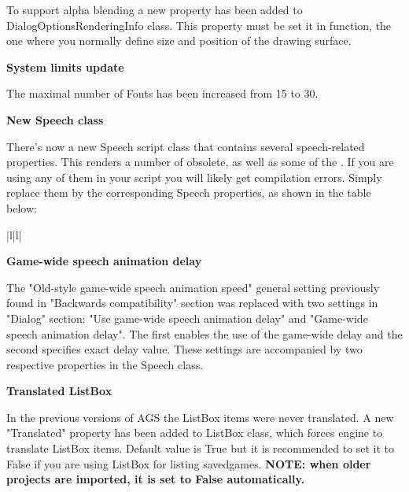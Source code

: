 To support alpha blending a new 
property has been added to DialogOptionsRenderingInfo class. This property must be set it in
 function, the one where you
normally define size and position of the drawing surface.

\bf{System limits update}

The maximal number of Fonts has been increased from 15 to 30.

\bf{New Speech class}

There's now a new Speech script class that contains several speech-related properties. This renders a
number of  obsolete, as well as some of the
.
If you are using any of them in your script you will likely get compilation errors. Simply replace
them by the corresponding Speech properties, as shown in the table below:

\begin{tabular}{|l|l|}
\end{tabular}

\bf{Game-wide speech animation delay}

The "Old-style game-wide speech animation speed" general setting previously found in
"Backwards compatibility" section was replaced with two settings in "Dialog" section:
"Use game-wide speech animation delay" and "Game-wide speech animation delay". The first enables the
use of the game-wide delay and the second specifies exact delay value.
These settings are accompanied by two respective properties in the Speech class.

\bf{Translated ListBox}

In the previous versions of AGS the ListBox items were never translated. A new "Translated" property
has been added to ListBox class, which forces engine to translate ListBox items. Default value is True
but it is recommended to set it to False if you are using ListBox for listing savedgames.
\bf{NOTE:} when older projects are imported, it is set to False automatically.


